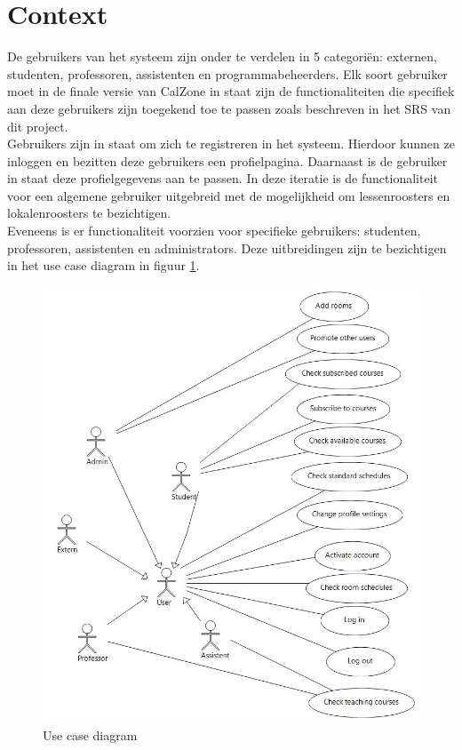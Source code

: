 \section{Context}
\label{sec:context}

De gebruikers van het systeem zijn onder te verdelen in 5 categori\"{e}n: externen, studenten, professoren, assistenten en programmabeheerders. 
Elk soort gebruiker moet in de finale versie van CalZone in staat zijn de functionaliteiten die specifiek aan deze gebruikers zijn toegekend toe te passen zoals beschreven in het SRS\cite{SRS} van dit project. 
\\
Gebruikers zijn in staat om zich te registreren in het systeem. 
Hierdoor kunnen ze inloggen en bezitten deze gebruikers een profielpagina.
Daarnaast is de gebruiker in staat deze profielgegevens aan te passen.
In deze iteratie is de functionaliteit voor een algemene gebruiker uitgebreid met de mogelijkheid om lessenroosters en lokalenroosters te bezichtigen.
\\
Eveneens is er functionaliteit voorzien voor specifieke gebruikers: studenten, professoren, assistenten en administrators.
Deze uitbreidingen zijn te bezichtigen in het use case diagram in figuur \ref{fig:usecase}.

\begin{figure}[H]
	\centering
	\includegraphics[scale=0.5]{img/use_cases}
	\caption{Use case diagram}
	\label{fig:usecase}
\end{figure}